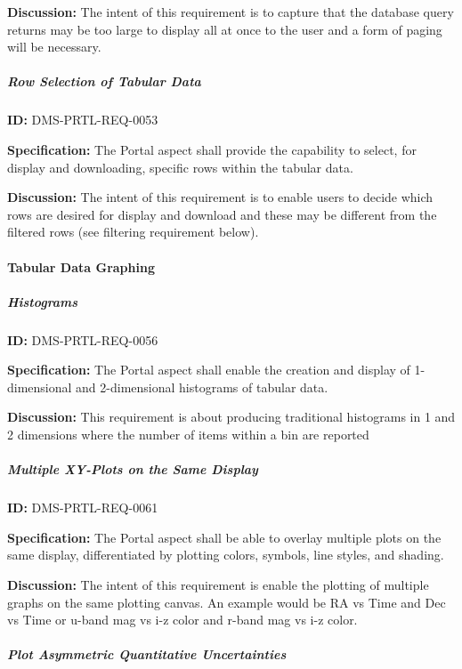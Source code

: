 \documentclass[SE,toc,lsstdraft]{lsstdoc}
\begin{document}
\textbf{Discussion:}
The intent of this requirement is to capture that the database query returns may be too large to display all at once to the user and a form of paging will be necessary.

\subparagraph{Row Selection of Tabular Data}\hfill  %

\label{DMS-PRTL-REQ-0053}
\textbf{ID:} DMS-PRTL-REQ-0053

\textbf{Specification:}
The Portal aspect shall provide the capability to select, for display and downloading, specific rows within the tabular data.

\textbf{Discussion:}
The intent of this requirement is to enable users to decide which rows are desired for display and download and these may be different from the filtered rows (see filtering requirement below).

\paragraph{Tabular Data Graphing}\hfill  %

\subparagraph{Histograms}\hfill  %

\label{DMS-PRTL-REQ-0056}
\textbf{ID:} DMS-PRTL-REQ-0056

\textbf{Specification:}
The Portal aspect shall enable the creation and display of 1-dimensional and 2-dimensional histograms of tabular data.

\textbf{Discussion:}
This requirement is about producing traditional histograms in 1 and 2 dimensions where the number of items within a bin are reported

\subparagraph{Multiple XY-Plots on the Same Display}\hfill  %

\label{DMS-PRTL-REQ-0061}
\textbf{ID:} DMS-PRTL-REQ-0061

\textbf{Specification:}
The Portal aspect shall be able to overlay multiple plots on the same display, differentiated by plotting colors, symbols, line styles, and shading.

\textbf{Discussion:}
The intent of this requirement is enable the plotting of multiple graphs on the same plotting canvas.  An example would be RA vs Time and Dec vs Time or u-band mag vs i-z color and r-band mag vs i-z color.

\subparagraph{Plot Asymmetric Quantitative Uncertainties}\hfill  %
\end{document}
